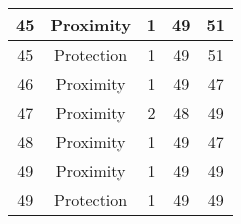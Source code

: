 \documentclass[results.tex]{subfiles}
\begin{document}
\begin{center}
\begin{tabular}{| c || c | c | c | c |}
            \hline
            45                      & Proximity                    & 1                      & 49                      & 51                   \\
            \hline
            45                      & Protection                   & 1                      & 49                      & 51                   \\
            \hline
            46                      & Proximity                    & 1                      & 49                      & 47                   \\
            \hline
            47                      & Proximity                    & 2                      & 48                      & 49                   \\
            \hline
            48                      & Proximity                    & 1                      & 49                      & 47                   \\
            \hline
            49                      & Proximity                    & 1                      & 49                      & 49                   \\
            \hline
            49                      & Protection                   & 1                      & 49                      & 49                   \\
            \hline
        \end{tabular}
    \end{center}
\end{document}
